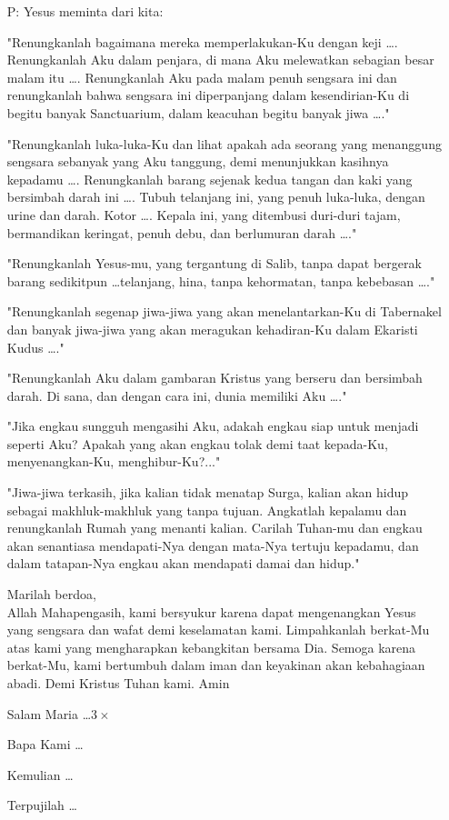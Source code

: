 \documentclass[a5paper,headsepline,titlepage,10pt,nnormalheadings,DIVcalc]{scrbook}
\newcommand{\BP}[1]{\begin{itemize} \item[P:] #1 \end{itemize}}
\begin{document}
\BP{
Yesus meminta dari kita:

"Renungkanlah bagaimana mereka memperlakukan-Ku dengan keji \dots . Renungkanlah Aku dalam penjara, di mana Aku melewatkan sebagian besar malam itu \dots . Renungkanlah Aku pada malam penuh sengsara ini dan renungkanlah bahwa sengsara ini diperpanjang dalam kesendirian-Ku di begitu banyak Sanctuarium, dalam keacuhan begitu banyak jiwa \dots ."

"Renungkanlah luka-luka-Ku dan lihat apakah ada seorang yang menanggung sengsara sebanyak yang Aku tanggung, demi menunjukkan kasihnya kepadamu \dots . Renungkanlah barang sejenak kedua tangan dan kaki yang bersimbah darah ini \dots . Tubuh telanjang ini, yang penuh luka-luka, dengan urine dan darah. Kotor \dots . Kepala ini, yang ditembusi duri-duri tajam, bermandikan keringat, penuh debu, dan berlumuran darah \dots ."  

"Renungkanlah Yesus-mu, yang tergantung di Salib, tanpa dapat bergerak barang sedikitpun \dots  telanjang, hina, tanpa kehormatan, tanpa kebebasan \dots ."

"Renungkanlah segenap jiwa-jiwa yang akan menelantarkan-Ku di Tabernakel dan banyak jiwa-jiwa yang akan meragukan kehadiran-Ku dalam Ekaristi Kudus \dots ."

"Renungkanlah Aku dalam gambaran Kristus yang berseru dan bersimbah darah. Di sana, dan dengan cara ini, dunia memiliki Aku \dots ."

"Jika engkau sungguh mengasihi Aku, adakah engkau siap untuk menjadi seperti Aku? Apakah yang akan engkau tolak demi taat kepada-Ku, menyenangkan-Ku, menghibur-Ku?..."

"Jiwa-jiwa terkasih, jika kalian tidak menatap Surga, kalian akan hidup sebagai makhluk-makhluk yang tanpa tujuan. Angkatlah kepalamu dan renungkanlah Rumah yang menanti kalian. Carilah Tuhan-mu dan engkau akan senantiasa mendapati-Nya dengan mata-Nya tertuju kepadamu, dan dalam tatapan-Nya engkau akan mendapati damai dan hidup."

	Marilah berdoa,\\
	Allah Mahapengasih, kami bersyukur karena dapat mengenangkan Yesus yang sengsara dan wafat demi keselamatan kami. Limpahkanlah berkat-Mu atas kami yang mengharapkan kebangkitan bersama Dia. Semoga karena berkat-Mu, kami bertumbuh dalam iman dan keyakinan akan kebahagiaan abadi. Demi Kristus Tuhan kami. Amin

Salam Maria \dots $3\times$

Bapa Kami \dots 

Kemulian \dots

Terpujilah \dots
}
\end{document}
